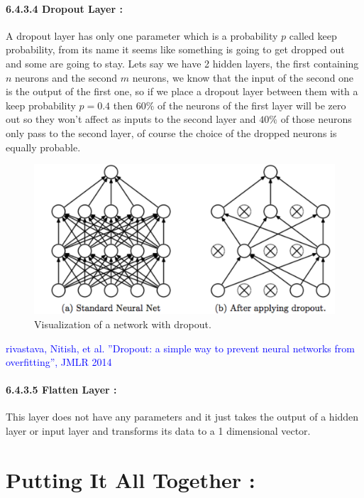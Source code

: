 \documentclass[10pt,a4paper]{article}
\begin{document}
\paragraph{6.4.3.4 Dropout Layer :}
A dropout layer has only one parameter which is a probability $ p $ called keep probability, from its name it seems like something is going to get dropped out and some are going to stay. Lets say we have 2 hidden layers, the first containing $ n $ neurons and the second $ m $ neurons, we know that the input of the second one is the output of the first one, so if we place a dropout layer between them with a keep probability $ p = 0.4 $ then $ 60\% $ of the neurons of the first layer will be zero out so they won't affect as inputs to the second layer and $ 40\% $ of those neurons only pass to the second layer, of course the choice of the dropped neurons is equally probable.
\begin{figure}[H]
\centering
\includegraphics[scale=0.4]{dropout.png}
\caption{Visualization of a network with dropout.}
\end{figure}
\begin{center}
\textcolor{blue}{\small rivastava, Nitish, et al. ”Dropout: a simple way to prevent neural networks from
overfitting”, JMLR 2014}
\end{center}
\paragraph{6.4.3.5 Flatten Layer :}
This layer does not have any parameters and it just takes the output of a hidden layer or input layer and transforms its data to a 1 dimensional vector.

\section{Putting It All Together :}
\end{document}
